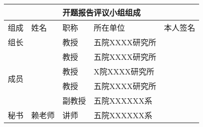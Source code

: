 {
	\noindent
\begin{tabular*}{0.999\textwidth}{|p{}<{\centering}|p{}<{\centering}|p{}<{\centering}|p{}<{\centering}|p{}<{\centering}|}
    \multicolumn{5}{|c|}{	\songti 开题报告评议小组组成}	\\
	\hline
	{\songti 组成} & {\songti 姓名} & {\songti 职称} &  {\songti  所在单位} & {\songti 本人签名}  \\
	\hline 
	{\songti 组长}     &   & 教授 &  五院XXXX研究所 &  \\ 
	\hline 
	\multirow{4}{8pt}{\songti 成员}  &   &  教授&  五院XXXX研究所 & \\ 
	\cline{2-5}
	   &   &  教授&  X院XXXX研究所 & \\ 
	\cline {2-5}
	   &   &  教授&  五院XXXX研究所 & \\ 
	\cline {2-5}
	   &   &  副教授&  五院XXXXXX系 & \\ 
	\hline 
	{\songti 秘书}   & 赖老师 & 讲师 &  五院XXXXXX系 & \\ 
	\hline 
\end{tabular*} 
   \indent
}
